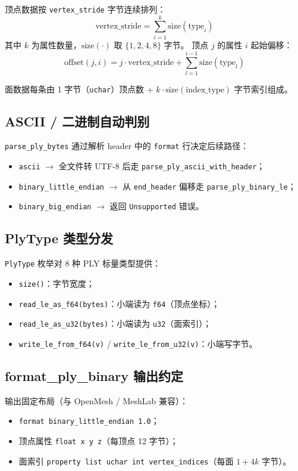 \documentclass[11pt,a4paper]{article}
\begin{document}
顶点数据按 \texttt{vertex\_stride} 字节连续排列：
\[
  \text{vertex\_stride} = \sum_{i=1}^{k} \text{size}(\text{type}_i)
\]
其中 $k$ 为属性数量，$\text{size}(\cdot)$ 取 $\{1, 2, 4, 8\}$ 字节。
顶点 $j$ 的属性 $i$ 起始偏移：
\[
  \text{offset}(j, i) = j \cdot \text{vertex\_stride} + \sum_{l=1}^{i-1} \text{size}(\text{type}_l)
\]

面数据每条由 1 字节（\texttt{uchar}）顶点数 + $k \cdot \text{size}(\text{index\_type})$ 字节索引组成。

\subsection{ASCII / 二进制自动判别}

\texttt{parse\_ply\_bytes} 通过解析 header 中的 \texttt{format} 行决定后续路径：
\begin{itemize}
  \item \texttt{ascii} $\to$ 全文件转 UTF-8 后走 \texttt{parse\_ply\_ascii\_with\_header}；
  \item \texttt{binary\_little\_endian} $\to$ 从 \texttt{end\_header} 偏移走 \texttt{parse\_ply\_binary\_le}；
  \item \texttt{binary\_big\_endian} $\to$ 返回 \texttt{Unsupported} 错误。
\end{itemize}

\subsection{PlyType 类型分发}

\texttt{PlyType} 枚举对 8 种 PLY 标量类型提供：
\begin{itemize}
  \item \texttt{size()}：字节宽度；
  \item \texttt{read\_le\_as\_f64(bytes)}：小端读为 \texttt{f64}（顶点坐标）；
  \item \texttt{read\_le\_as\_u32(bytes)}：小端读为 \texttt{u32}（面索引）；
  \item \texttt{write\_le\_from\_f64(v)} / \texttt{write\_le\_from\_u32(v)}：小端写字节。
\end{itemize}

\subsection{format\_ply\_binary 输出约定}

输出固定布局（与 OpenMesh / MeshLab 兼容）：
\begin{itemize}
  \item \texttt{format binary\_little\_endian 1.0}；
  \item 顶点属性 \texttt{float x y z}（每顶点 12 字节）；
  \item 面索引 \texttt{property list uchar int vertex\_indices}（每面 $1 + 4k$ 字节）。
\end{itemize}
\end{document}
